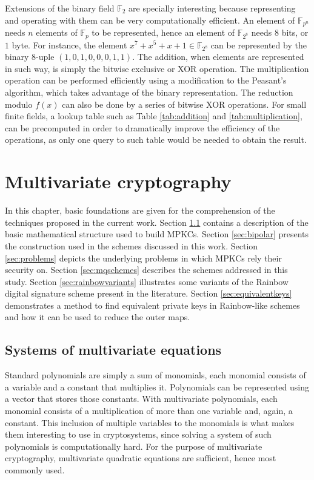 \documentclass{ufsctex/ufsctex}
\begin{document}
Extensions of the binary field $\mathbb{F}_2$ are specially interesting because
representing and operating with them can be very computationally efficient. An
element of $\mathbb{F}_{p^n}$ needs $n$ elements of $\mathbb{F}_p$ to be
represented, hence an element of $\mathbb{F}_{2^8}$ needs $8$ bits, or $1$
byte. For instance, the element $x^7 + x^5 + x + 1 \in \mathbb{F}_{2^8}$ can be
represented by the binary $8$-uple $(1, 0, 1, 0, 0, 0, 1, 1)$. The addition,
when elements are represented in such way, is simply the bitwise exclusive or
XOR operation. The multiplication operation can be performed efficiently using
a modification to the Peasant's algorithm, which takes advantage of the binary
representation. The reduction modulo $f(x)$ can also be done by a series of
bitwise XOR operations. For small finite fields, a lookup table such as Table
\ref{tab:addition} and \ref{tab:multiplication}, can be precomputed in order to
dramatically improve the efficiency of the operations, as only one query to
such table would be needed to obtain the result.

\chapter{Multivariate cryptography}

In this chapter, basic foundations are given for the comprehension of the
techniques proposed in the current work. Section \ref{sec:mqsystems} contains a
description of the basic mathematical structure used to build MPKCs. Section
\ref{sec:bipolar} presents the construction used in the schemes discussed in
this work. Section \ref{sec:problems} depicts the underlying problems in which
MPKCs rely their security on. Section \ref{sec:mqschemes} describes the schemes
addressed in this study. Section \ref{sec:rainbowvariants} illustrates some
variants of the Rainbow digital signature scheme present in the literature.
Section \ref{sec:equivalentkeys} demonstrates a method to find equivalent
private keys in Rainbow-like schemes and how it can be used to reduce the outer
maps.

\section{Systems of multivariate equations}\label{sec:mqsystems}

Standard polynomials are simply a sum of monomials, each monomial consists of a
variable and a constant that multiplies it. Polynomials can be represented
using a vector that stores those constants. With multivariate polynomials, each
monomial consists of a multiplication of more than one variable and, again, a
constant. This inclusion of multiple variables to the monomials is what makes
them interesting to use in cryptosystems, since solving a system of such
polynomials is computationally hard. For the purpose of multivariate
cryptography, multivariate quadratic equations are sufficient, hence most
commonly used.
\end{document}
